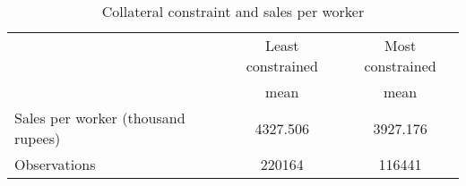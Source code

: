\begin{table}[htbp]\centering
\def\sym#1{\ifmmode^{#1}\else\(^{#1}\)\fi}
\caption{Collateral constraint and sales per worker}
\begin{tabular}{l*{2}{c}}
\toprule
                    &\multicolumn{1}{c}{Least constrained}&\multicolumn{1}{c}{Most constrained}\\
                    &        mean&        mean\\
\midrule
Sales per worker (thousand rupees)&    4327.506&    3927.176\\
\midrule
Observations        &      220164&      116441\\
\bottomrule
\end{tabular}
\end{table}
